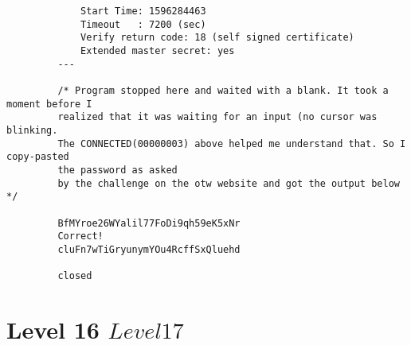 \documentclass[a4paper]{report}
\begin{document}
\begin{verbatim}
    		 Start Time: 1596284463
    		 Timeout   : 7200 (sec)
    		 Verify return code: 18 (self signed certificate)
    		 Extended master secret: yes
		 ---

		 /* Program stopped here and waited with a blank. It took a moment before I 
		 realized that it was waiting for an input (no cursor was blinking. 
		 The CONNECTED(00000003) above helped me understand that. So I copy-pasted
		 the password as asked 
		 by the challenge on the otw website and got the output below */

		 BfMYroe26WYalil77FoDi9qh59eK5xNr
		 Correct!
		 cluFn7wTiGryunymYOu4RcffSxQluehd

		 closed
\end{verbatim}


\section{Level 16 \rightarrow $ Level 17 $}
\end{document}
